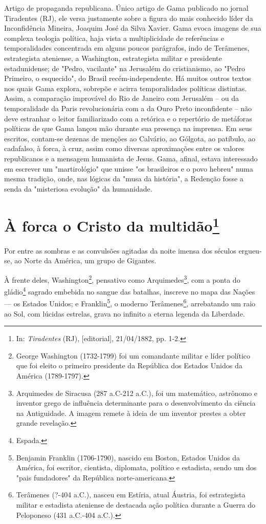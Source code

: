 {{\small\noindent
Artigo de propaganda republicana. Único artigo de Gama publicado
no jornal Tiradentes (RJ), ele versa justamente sobre a figura do mais
conhecido líder da Inconfidência Mineira, Joaquim José da Silva Xavier.
Gama evoca imagens de sua complexa teologia política, haja vista a
multiplicidade de referências e temporalidades concentrada em alguns
poucos parágrafos, indo de Terâmenes, estrategista ateniense, a
Washington, estrategista militar e presidente estadunidense; de "Pedro,
vacilante" na Jerusalém do cristianismo, ao "Pedro Primeiro, o
esquecido", do Brasil recém-independente. Há muitos outros textos nos
quais Gama explora, sobrepõe e acirra temporalidades políticas
distintas. Assim, a comparação improvável do Rio de Janeiro com
Jerusalém -- ou da temporalidade da Paris revolucionária com a da Ouro
Preto inconfidente -- não deve estranhar o leitor familiarizado com a
retórica e o repertório de metáforas políticas de que Gama lançou mão
durante sua presença na imprensa. Em seus escritos, contam-se dezenas de
menções ao Calvário, ao Gólgota, ao patíbulo, ao cadafalso, à forca, à
cruz, assim como diversas aproximações entre os valores republicanos e a
mensagem humanista de Jesus. Gama, afinal, estava interessado em
escrever um "martirológio" que unisse "os brasileiros e o povo hebreu"
numa mesma tradição, onde, nas lógicas da "musa da história", a Redenção
fosse a senda da "misteriosa evolução" da humanidade. }

\chapter{À forca o Cristo da multidão\footnote[*]{In:
  \emph{Tiradentes} (RJ), {[}editorial{]}, 21/04/1882, pp. 1-2.}}

Por entre as sombras e as convulsões agitadas da noite imensa dos
séculos ergueu-se, ao Norte da América, um grupo de Gigantes.

À frente deles, Washington\footnote{George Washington (1732-1799) foi
  um comandante militar e líder político que foi eleito o primeiro
  presidente da República dos Estados Unidos da América (1789-1797).},
pensativo como Arquimedes\footnote{Arquimedes de Siracusa (287 a.C-212
  a.C.), foi um matemático, astrônomo e inventor grego de influência
  determinante para o desenvolvimento da ciência na Antiguidade. A
  imagem remete à ideia de um inventor prestes a obter grande revelação.},
com a ponta do gládio\footnote{Espada.} sagrado embebida no sangue das
batalhas, inscreve no mapa das Nações --- os Estados Unidos; e
Franklin\footnote{Benjamin Franklin (1706-1790), nascido em Boston,
  Estados Unidos da América, foi escritor, cientista, diplomata,
  político e estadista, sendo um dos "pais fundadores" da República
  norte-americana.}, o moderno Terâmenes\footnote{Terâmenes (?-404
  a.C.), nasceu em Estíria, atual Áustria, foi estrategista militar e
  estadista ateniense de destacada ação política durante a Guerra do
  Peloponeso (431 a.C.-404 a.C.).}, arrebatando um raio ao Sol, com
lúcidas estrelas, grava no infinito a eterna legenda da Liberdade.

}
